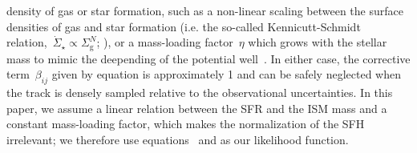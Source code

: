 \documentclass[ms.tex]{subfiles}
\begin{document}
density of gas or star formation, such as a non-linear scaling between the
surface densities of gas and star formation (i.e. the so-called
Kennicutt-Schmidt relation,~$\dot{\Sigma}_\star \propto \Sigma_\text{g}^N$;
\citealp{Kennicutt1998, delosReyes2019, Kennicutt2021}), or a mass-loading
factor~$\eta$ which grows with the stellar mass to mimic the deepending of
the potential well~\citep[e.g.][]{Conroy2022}.
In either case, the corrective term~$\beta_{ij}$ given by equation
 is approximately 1 and can be safely neglected when
the track is densely sampled relative to the observational uncertainties.
In this paper, we assume a linear relation between the SFR and the ISM mass and
a constant mass-loading factor, which makes the normalization of the SFH
irrelevant; we therefore use equations~ and
 as our likelihood function.
\end{document}
